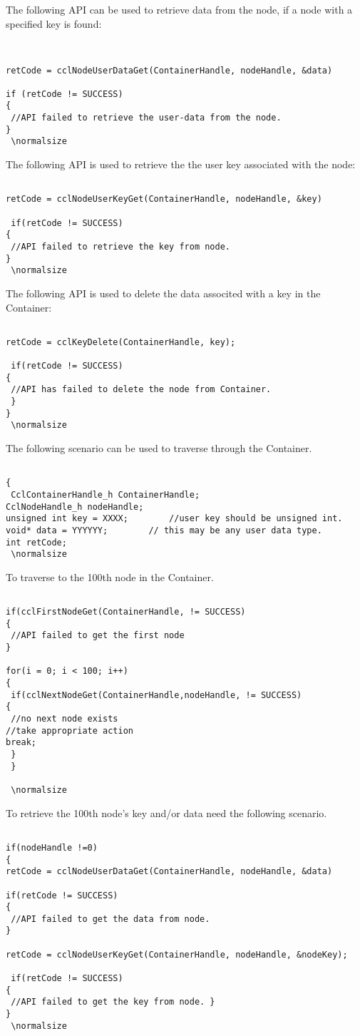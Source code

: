 The following API can be used to retrieve data from the node, if a node with a specified key is found:
\footnotesize\begin{verbatim}


retCode = cclNodeUserDataGet(ContainerHandle, nodeHandle, &data)

if (retCode != SUCCESS)
{
 //API failed to retrieve the user-data from the node. 
}
 \normalsize\end{verbatim}


The following API is used to retrieve the the user key associated with the node:
\footnotesize\begin{verbatim}

retCode = cclNodeUserKeyGet(ContainerHandle, nodeHandle, &key)

 if(retCode != SUCCESS)
{
 //API failed to retrieve the key from node. 
}
 \normalsize\end{verbatim}

The following API is used to delete the data associted with a key in the Container:
\footnotesize\begin{verbatim}

retCode = cclKeyDelete(ContainerHandle, key);

 if(retCode != SUCCESS)
{
 //API has failed to delete the node from Container.
 } 
}
 \normalsize\end{verbatim}

The following scenario can be used to traverse through the Container. 
\footnotesize\begin{verbatim}

{
 CclContainerHandle_h ContainerHandle;
CclNodeHandle_h nodeHandle;
unsigned int key = XXXX; 		//user key should be unsigned int.
void* data = YYYYYY; 		// this may be any user data type.
int retCode;
 \normalsize\end{verbatim}

To traverse to the 100th node in the Container.
 \footnotesize\begin{verbatim}

if(cclFirstNodeGet(ContainerHandle, != SUCCESS)
{
 //API failed to get the first node 
}

for(i = 0; i < 100; i++)
{
 if(cclNextNodeGet(ContainerHandle,nodeHandle, != SUCCESS)
{
 //no next node exists 
//take appropriate action
break;
 }
 }

 \normalsize\end{verbatim}


 To retrieve the 100th node's key and/or data need the following scenario.
 \footnotesize\begin{verbatim}

if(nodeHandle !=0)
{
retCode = cclNodeUserDataGet(ContainerHandle, nodeHandle, &data) 

if(retCode != SUCCESS)
{
 //API failed to get the data from node. 
}

retCode = cclNodeUserKeyGet(ContainerHandle, nodeHandle, &nodeKey);

 if(retCode != SUCCESS)
{
 //API failed to get the key from node. }
}
 \normalsize\end{verbatim}

